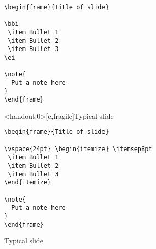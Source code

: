 \documentclass[12pt,t]{beamer}
\begin{document}
\newsavebox{\codeboxone}
\begin{lrbox}{\codeboxone}
\begin{lstlisting}
\begin{frame}{Title of slide}

\bbi
 \item Bullet 1
 \item Bullet 2
 \item Bullet 3
\ei

\note{
  Put a note here
}
\end{frame}
\end{lstlisting}
\end{lrbox}

\begin{frame}<handout:0>[c,fragile]{Typical slide}

\usebox{\codeboxone}

\end{frame}


\newsavebox{\codeboxtwo}
\begin{lrbox}{\codeboxtwo}
\begin{lstlisting}
\begin{frame}{Title of slide}

\vspace{24pt} \begin{itemize} \itemsep8pt
 \item Bullet 1
 \item Bullet 2
 \item Bullet 3
\end{itemize}

\note{
  Put a note here
}
\end{frame}
\end{lstlisting}
\end{lrbox}

\begin{frame}[c,fragile]{Typical slide}
\addtocounter{framenumber}{-1}

\usebox{\codeboxtwo}

\end{frame}
\end{document}
